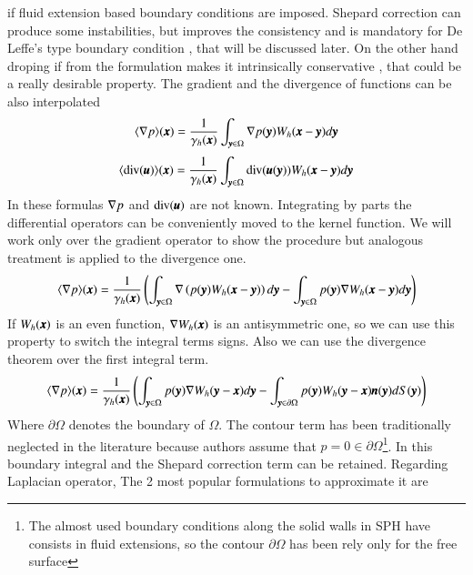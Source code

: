 if fluid extension based boundary conditions are imposed. Shepard correction can produce some
instabilities, but improves the consistency and is mandatory for De Leffe's type boundary condition
\citep{deleffe_etal_spheric09,ferrand_etal_2012}, that will be discussed later. On the other hand
droping if from the formulation makes it intrinsically conservative \citep{mon2005}, that could be
a really desirable property.\rc
%
The gradient and the divergence of functions can be also interpolated
%
\begin{eqnarray}
\langle \nabla p \rangle (\pmb{x}) = \frac{1}{\gamma_h(\pmb{x})} \int_{\pmb{y} \in \Omega} \nabla p(\pmb{y}) W_h(\pmb{x} - \pmb{y}) d\pmb{y}
\end{eqnarray}
\begin{eqnarray}
\langle \mbox{div}(\pmb{u}) \rangle (\pmb{x}) = \frac{1}{\gamma_h(\pmb{x})} \int_{\pmb{y} \in \Omega} \mbox{div}(\pmb{u}(\pmb{y})) W_h(\pmb{x} - \pmb{y}) d\pmb{y}
\end{eqnarray}
%
In these formulas $\nabla p$ and $\mbox{div}(\pmb{u})$ are not known. Integrating by parts the
differential operators can be conveniently moved to the kernel function. We will work only over the gradient
operator to show the procedure but analogous treatment is applied to the divergence one.
%
\begin{eqnarray}
\langle \nabla p \rangle (\pmb{x}) = \frac{1}{\gamma_h(\pmb{x})} \left(
	  \int_{\pmb{y} \in \Omega} \nabla \left( p(\pmb{y}) W_h(\pmb{x} - \pmb{y}) \right) d\pmb{y}
	- \int_{\pmb{y} \in \Omega} p(\pmb{y}) \nabla W_h(\pmb{x} - \pmb{y}) d\pmb{y}
\right)
\end{eqnarray}
%
If $W_h(\pmb{x})$ is an even function, $\nabla W_h(\pmb{x})$ is an antisymmetric one, so we can use
this property to switch the integral terms signs. Also we can use the divergence theorem over the first
integral term.
%
\begin{eqnarray}
\langle \nabla p \rangle (\pmb{x}) = \frac{1}{\gamma_h(\pmb{x})} \left(
	  \int_{\pmb{y} \in \Omega} p(\pmb{y}) \nabla W_h(\pmb{y} - \pmb{x}) d\pmb{y}
	- \int_{\pmb{y} \in \partial \Omega} p(\pmb{y}) W_h(\pmb{y} - \pmb{x}) \pmb{n}(\pmb{y}) dS(\pmb{y})
\right)
\end{eqnarray}
%
Where $\partial \Omega$ denotes the boundary of $\Omega$. The contour term has been traditionally neglected
in the literature because authors assume that $p = 0 \in \partial \Omega$\footnote{The almost used boundary
conditions along the solid walls in SPH have consists in fluid extensions, so the contour $\partial \Omega$
has been rely only for the free surface}. In \NAME this boundary integral and the Shepard correction term
can be retained.\rc
%
Regarding Laplacian operator, The 2 most popular formulations to approximate it are
